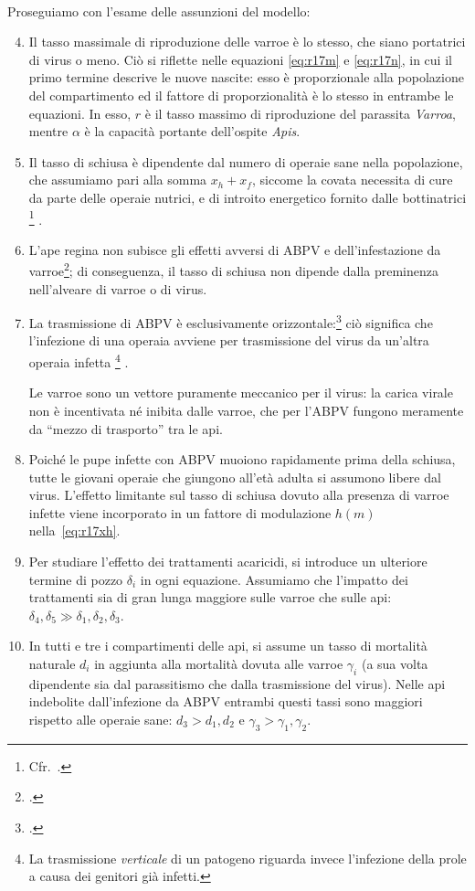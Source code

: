 \paragraph{}
Proseguiamo con l'esame delle assunzioni del modello:
\begin{enumerate}
    \setcounter{enumi}{3}
    \item Il tasso massimale di riproduzione delle varroe è lo stesso, che siano portatrici di virus o meno.
    Ciò si riflette nelle equazioni \eqref{eq:r17m} e \eqref{eq:r17n}, in cui il primo termine descrive le nuove nascite: esso è proporzionale alla popolazione del compartimento ed il fattore di proporzionalità è lo stesso in entrambe le equazioni. In esso, $r$ è il tasso massimo di riproduzione del parassita \emph{Varroa}, mentre $\alpha$ è la capacità portante dell'ospite \emph{Apis}.
    \item Il tasso di schiusa è dipendente dal numero di operaie sane nella popolazione, che assumiamo pari alla somma
    $x_h + x_f$, siccome la covata necessita di cure da parte delle operaie nutrici, e di introito energetico fornito
    dalle bottinatrici
    \footnote{Cfr.~\cite{khoury2011}.}
    .
    \item L'ape regina non subisce gli effetti avversi di ABPV e dell'infestazione da varroe\footcite{privFDL}; di conseguenza, il tasso di schiusa non dipende dalla preminenza nell'alveare di varroe o di virus.
    \item La trasmissione di ABPV è esclusivamente orizzontale:\footcite{privFDL}
    ciò significa che l'infezione di una operaia avviene per trasmissione del virus da un'altra operaia infetta
    \footnote{La trasmissione \emph{verticale} di un patogeno riguarda invece l'infezione della prole a causa dei genitori già infetti.}
    .

    Le varroe sono un vettore puramente meccanico per il virus: la carica virale non è incentivata né
    inibita dalle varroe, che per l'ABPV fungono meramente da ``mezzo di trasporto'' tra le api.
    \item Poiché le pupe infette con ABPV muoiono rapidamente prima della schiusa, tutte le giovani operaie che
    giungono all'età adulta si assumono libere dal virus. L'effetto limitante sul tasso di schiusa dovuto alla
    presenza di varroe infette viene incorporato in un fattore di modulazione $h(m)$ nella~\eqref{eq:r17xh}.
    \item Per studiare l'effetto dei trattamenti acaricidi, si introduce un ulteriore termine di pozzo $\delta_i$ in ogni equazione. Assumiamo che l'impatto dei trattamenti sia di gran lunga maggiore sulle varroe che sulle api: $\delta_4, \delta_5 \gg \delta_1, \delta_2, \delta_3$.
    \item In tutti e tre i compartimenti delle api, si assume un tasso di mortalità naturale $d_i$ in aggiunta alla mortalità dovuta alle varroe $\gamma_i$ (a sua volta dipendente sia dal parassitismo che dalla trasmissione del virus). Nelle api indebolite dall'infezione da ABPV entrambi questi tassi sono maggiori rispetto alle operaie sane: $d_3 > d_1, d_2$ e $\gamma_3 > \gamma_1, \gamma_2$.


\end{enumerate}
